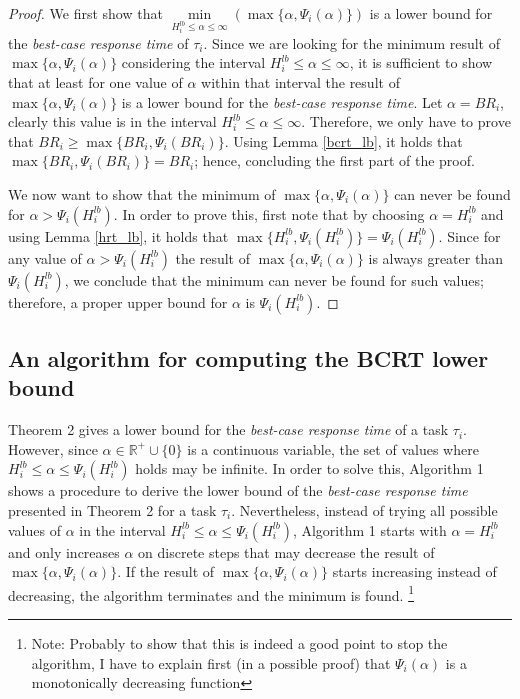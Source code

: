 \documentclass[fleqn]{article}
\begin{document}
\begin{proof}
	We first show that $\min \limits_{H_i^{lb} \leq \alpha \leq \infty} (\max \{ \alpha, \Psi_i(\alpha) \})$ is a lower bound for the \textit{best-case response time} of $\tau_i$. Since we are looking for the minimum result of $\max \{ \alpha, \Psi_i(\alpha)\}$ considering the interval $H_i^{lb} \leq \alpha \leq \infty$, it is sufficient to show that at least for one value of $\alpha$ within that interval the result of $\max \{ \alpha, \Psi_i(\alpha)\}$ is a lower bound for the \textit{best-case response time}. Let $\alpha = BR_i$, clearly this value is in the interval $H_i^{lb} \leq \alpha \leq \infty$. Therefore, we only have to prove that $BR_i \geq \max\{BR_i, \Psi_i(BR_i)\}$. Using Lemma \ref{bcrt_lb}, it holds that $\max\{BR_i, \Psi_i(BR_i)\}=BR_i$; hence, concluding the first part of the proof.
	
	We now want to show that the minimum of $\max \{ \alpha, \Psi_i(\alpha)\}$ can never be found for $\alpha > \Psi_i(H^{lb}_i)$. In order to prove this, first note that by choosing $\alpha = H_i^{lb}$ and using Lemma \ref{hrt_lb}, it holds that $\max\{H^{lb}_i, \Psi_i(H^{lb}_i)\}=\Psi_i(H^{lb}_i)$. Since for any value of $\alpha > \Psi_i(H^{lb}_i)$ the result of $\max \{ \alpha, \Psi_i(\alpha)\}$ is always greater than $\Psi_i(H^{lb}_i)$, we conclude that the minimum can never be found for such values; therefore, a proper upper bound for $\alpha$ is $\Psi_i(H^{lb}_i)$.
\end{proof}

\subsection{An algorithm for computing the BCRT lower bound}

Theorem 2 gives a lower bound for the \textit{best-case response time} of a task $\tau_i$. However, since $\alpha \in \mathbb{R^+} \cup \{ 0 \}$ is a continuous variable, the set of values where $H_i^{lb} \leq \alpha \leq \Psi_i(H_i^{lb})$ holds may be infinite. In order to solve this, Algorithm 1 shows a procedure to derive the lower bound of the \textit{best-case response time}  presented in Theorem 2 for a task $\tau_i$. Nevertheless, instead of trying all possible values of $\alpha$ in the interval $H_i^{lb} \leq \alpha \leq \Psi_i(H_i^{lb})$, Algorithm 1 starts with $\alpha=H_i^{lb}$ and only increases $\alpha$ on discrete steps that may decrease the result of $\max \{ \alpha, \Psi_i(\alpha)\}$. If the result of $\max \{ \alpha, \Psi_i(\alpha)\}$ starts increasing instead of decreasing, the algorithm terminates and the minimum is found. \footnote{Note: Probably to show that this is indeed a good point to stop the algorithm, I have to explain first (in a possible proof) that $\Psi_i(\alpha)$ is a monotonically decreasing function}
\end{document}
